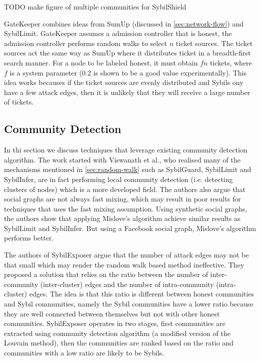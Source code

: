 TODO make figure of multiple communities for SybilShield

GateKeeper\cite{tran2011optimal} combines ideas from SumUp (discussed in
\autoref{sec:network-flow}) and SybilLimit. GateKeeper assumes a admission
controller that is honest, the admission controller performs random walks to
select $n$ ticket sources. The ticket sources act the same way as SumUp where it
distributes ticket in a breadth-first search manner. For a node to be labeled
honest, it must obtain $fn$ tickets, where $f$ is a system parameter (0.2 is
shown to be a good value experimentally). This idea works becauses if the ticket
sources are evenly distributed and Sybils ony have a few attack edges, then it
is unlikely that they will receive a large number of tickets.


\subsection{Community Detection}
In thi section we discuss techniques that leverage existing community detection
algorithm. The work started with Viswanath et al., who realised many of the
mechanisms mentioned in \autoref{sec:random-walk} such as SybilGuard, SybilLimit
and SybilInfer, are in fact performing local community detection (i.e. detecting
clusters of nodes) which is a more developed field\cite{viswanath2010analysis}.
The authors also argue that social graphs are not always fast mixing, which may
result in poor results for techniques that uses the fast mixing assumption.
Using synthetic social graphs, the authors show that applying Mislove's
algorithm\cite{mislove2010you} achieve similar results as SybilLimit and
SybilInfer. But using a Facebook social graph, Mislove's algorithm performs
better.

The authors of SybilExposer\cite{misra2016sybilexposer} argue that the number of
attack edges may not be that small which may render the random walk based method
ineffective. They proposed a solution that relies on the ratio between the
number of inter-community (inter-cluster) edges and the number of
intra-community (intra-cluster) edges. The idea is that this ratio is different
between honest communities and Sybil communities, namely the Sybil communities have
a lower ratio because they are well connected between themselves but not with
other honest communities. SybilExposer operates in two stages, first communities
are extracted using community detection algorithm (a modified version of the
Louvain method\cite{blondel2008fast}), then the communities are ranked based on the
ratio and communities with a low ratio are likely to be Sybils.

